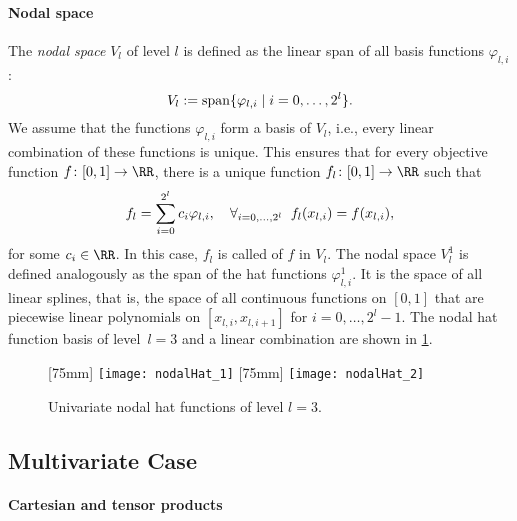 \paragraph{Nodal space}

%
%
The \emph{nodal space} $V_l$ of level $l$
is defined as the linear span of all basis functions
$\varphi_{l,i}$:
\begin{equation}
  V_l := \operatorname{span}\{\varphi_{l,i} \mid i = 0, \dotsc, 2^l\}.
\end{equation}
We assume that the functions $\varphi_{l,i}$ form a basis of $V_l$, i.e.,
every linear combination of these functions is unique.
%
%
This ensures that for every objective function $f\colon [0, 1] \to \RR$,
there is a unique function $f_l\colon [0, 1] \to \RR$ such that
\begin{equation}
  \label{eq:interpFullGridUV}
  f_l
  = \sum_{i=0}^{2^l} c_i \varphi_{l,i},\quad
  \forall_{i = 0, \dotsc, 2^l}\;\;f_l(x_{l,i}) = f(x_{l,i}),
\end{equation}
for some $c_i \in \RR$.
In this case, $f_l$ is called  of $f$ in $V_l$.
The nodal space $V_l^1$ is defined analogously as the span of the
hat functions $\varphi_{l,i}^1$.
It is the space of all linear splines,
that is, the space of all continuous functions on $[0, 1]$ that are
piecewise linear polynomials on $[x_{l,i}, x_{l,i+1}]$ for
$i = 0, \dotsc, 2^l - 1$.
The nodal hat function basis of level~$l = 3$
and a linear combination are shown in \cref{fig:nodalHat}.

\begin{figure}
  [75mm]{%
    \texttt{[image: nodalHat\_1]}%
  }%
  \hfill%
  [75mm]{%
    \texttt{[image: nodalHat\_2]}%
  }%
  \caption{Univariate nodal hat functions of level $l = 3$.}
  \label{fig:nodalHat}
\end{figure}

\subsection{Multivariate Case}

\paragraph{Cartesian and tensor products}

